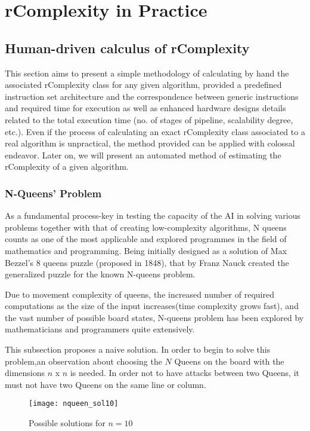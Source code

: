 \chapter{rComplexity in Practice}

\section{Human-driven calculus of rComplexity}
This section aims to present a simple methodology of calculating by hand the associated rComplexity class for any given algorithm, provided a predefined instruction set architecture and the correspondence between generic instructions and required time for execution as well as enhanced hardware designs details related to the total execution time (no. of stages of pipeline, scalability degree, etc.)\cite{hennessy2011computer}. Even if the process of calculating an exact rComplexity class associated to a real algorithm is unpractical, the method provided can be applied with colossal endeavor. Later on, we will present an automated method of estimating the rComplexity of a given algorithm.

\subsection{N-Queens’ Problem}


As a fundamental process-key in testing the capacity of the AI in solving various problems together with that of creating low-complexity algorithms, N queens counts as one of the most applicable and explored programmes in the field of mathematics and programming. Being initially designed as a solution of Max Bezzel’s 8 queens puzzle (proposed in 1848), that by Franz Nauck created the generalized puzzle for the known N-queens problem. 

Due to movement complexity of queens, the increased number of required computations as the size of the input increases(time complexity grows fast), and the vast number of possible board states, N-queens problem has been explored by mathematicians and programmers quite extensively.

This subsection proposes a naive solution. In order to begin to solve this problem,an observation about choosing the $N$ Queens on the board with the dimensions $n$ x $n$ is needed. In order not to have attacks between two Queens, it must not have two Queens on the same line or column. 

\begin{figure}[H]
\centering
\texttt{[image: nqueen\_sol10]}
\caption{Possible solutions for $n=10$}
\end{figure}


